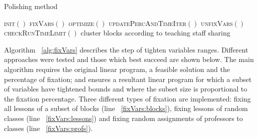 \begin{algorithm}[H]
  \caption{Polishing method
    \label{alg:polishing}} 
  \begin{algorithmic}[1]
    \Statex
			\State \textsc{init}$()$																	\label{polish:ln:init}
      																					\label{polish:ln:iter}
          \State \textsc{fixVars}$()$														\label{polish:ln:fix}
					\State \textsc{optimize}$()$													\label{polish:ln:opt}
					\State \textsc{updatePercAndTimeIter}$()$							\label{polish:ln:perc}
					\State \textsc{unfixVars}$()$													\label{polish:ln:unfix}
					\State \textsc{checkRunTimeLimit}$()$									\label{polish:ln:runtime}
      \EndWhile
     \State {}
    \EndFunction
	\Statex	
    														\label{alg:init}
				\State cluster blocks according to teaching staff sharing
    \EndProcedure
  \end{algorithmic}
\end{algorithm}		
		
		
Algorithm ~\ref{alg:fixVars} describes the step of tighten variables ranges. Different approaches were tested and those which best succeed are shown below. The main algorithm requires the original linear program, a feasible solution and the percentage of fixation; and ensures a resultant linear program for which a subset of variables have tightened bounds and where the subset size is proportional to the fixation percentage. Three different types of fixation are implemented: fixing all lessons of a subset of blocks (line ~\ref{fixVars:blocks}), fixing lessons of random classes (line ~\ref{fixVars:lessons}) and fixing random assignments of professors to classes (line ~\ref{fixVars:profs}).

